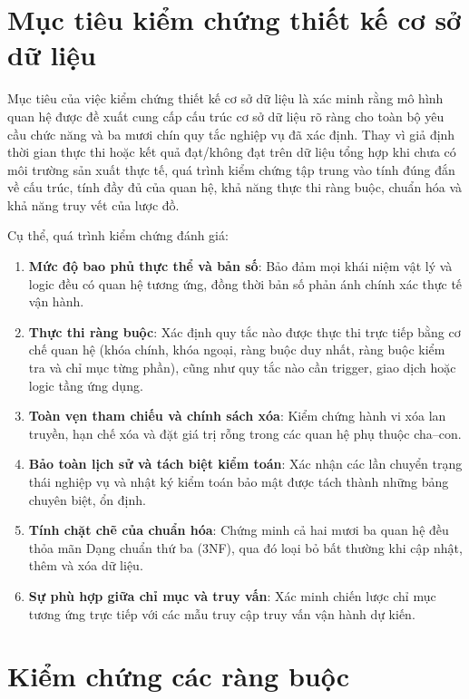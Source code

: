 \section{Mục tiêu kiểm chứng thiết kế cơ sở dữ liệu}\label{s:valobjectives}

Mục tiêu của việc kiểm chứng thiết kế cơ sở dữ liệu là xác minh rằng mô hình quan hệ được đề xuất cung cấp cấu trúc cơ sở dữ liệu rõ ràng cho toàn bộ yêu cầu chức năng và ba mươi chín quy tắc nghiệp vụ đã xác định. Thay vì giả định thời gian thực thi hoặc kết quả đạt/không đạt trên dữ liệu tổng hợp khi chưa có môi trường sản xuất thực tế, quá trình kiểm chứng tập trung vào tính đúng đắn về cấu trúc, tính đầy đủ của quan hệ, khả năng thực thi ràng buộc, chuẩn hóa và khả năng truy vết của lược đồ.

Cụ thể, quá trình kiểm chứng đánh giá:
\begin{enumerate}
    \item \textbf{Mức độ bao phủ thực thể và bản số}: Bảo đảm mọi khái niệm vật lý và logic đều có quan hệ tương ứng, đồng thời bản số phản ánh chính xác thực tế vận hành.
    \item \textbf{Thực thi ràng buộc}: Xác định quy tắc nào được thực thi trực tiếp bằng cơ chế quan hệ (khóa chính, khóa ngoại, ràng buộc duy nhất, ràng buộc kiểm tra và chỉ mục từng phần), cũng như quy tắc nào cần trigger, giao dịch hoặc logic tầng ứng dụng.
    \item \textbf{Toàn vẹn tham chiếu và chính sách xóa}: Kiểm chứng hành vi xóa lan truyền, hạn chế xóa và đặt giá trị rỗng trong các quan hệ phụ thuộc cha--con.
    \item \textbf{Bảo toàn lịch sử và tách biệt kiểm toán}: Xác nhận các lần chuyển trạng thái nghiệp vụ và nhật ký kiểm toán bảo mật được tách thành những bảng chuyên biệt, ổn định.
    \item \textbf{Tính chặt chẽ của chuẩn hóa}: Chứng minh cả hai mươi ba quan hệ đều thỏa mãn Dạng chuẩn thứ ba (3NF), qua đó loại bỏ bất thường khi cập nhật, thêm và xóa dữ liệu.
    \item \textbf{Sự phù hợp giữa chỉ mục và truy vấn}: Xác minh chiến lược chỉ mục tương ứng trực tiếp với các mẫu truy cập truy vấn vận hành dự kiến.
\end{enumerate}

\section{Kiểm chứng các ràng buộc}\label{s:constraintval}

